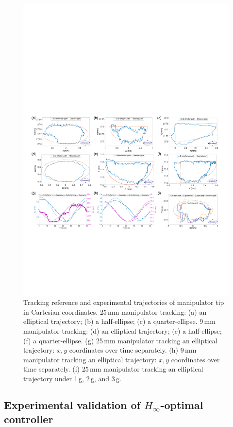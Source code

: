 \begin{figure}[t]
\centering
    \includegraphics[width=\textwidth]{Control_Picture_New_Ten.pdf}
    \caption{Tracking reference and experimental trajectories of  manipulator tip in Cartesian coordinates. 25\,mm manipulator tracking: (a) an elliptical trajectory; (b) a half-ellipse; (c) a quarter-ellipse. 9\,mm manipulator tracking: (d) an elliptical trajectory; (e) a half-ellipse; (f) a quarter-ellipse. (g) 25\,mm manipulator tracking an elliptical trajectory: $x,y$ coordinates over time separately. (h) 9\,mm manipulator tracking an elliptical trajectory: $x,y$ coordinates over time separately. (i) 25\,mm manipulator tracking an elliptical trajectory under 1\,g, 2\,g, and 3\,g.}
    \label{fig:Control_outputs}
\end{figure}
\subsection{Experimental validation of $H_\infty$-optimal controller}

